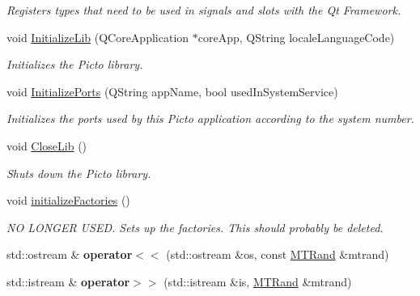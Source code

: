 \begin{DoxyCompactItemize}
\begin{DoxyCompactList}\small\item\em Registers types that need to be used in signals and slots with the Qt Framework. \end{DoxyCompactList}\item 
void \hyperlink{namespace_picto_ab626f6cf7953f6f0c2947f0f03b8e62e}{Initialize\-Lib} (Q\-Core\-Application $\ast$core\-App, Q\-String locale\-Language\-Code)
\begin{DoxyCompactList}\small\item\em Initializes the Picto library. \end{DoxyCompactList}\item 
void \hyperlink{namespace_picto_a435830b96734ccf94079709ecaababdd}{Initialize\-Ports} (Q\-String app\-Name, bool used\-In\-System\-Service)
\begin{DoxyCompactList}\small\item\em Initializes the ports used by this Picto application according to the system number. \end{DoxyCompactList}\item 
void \hyperlink{namespace_picto_a4c3a40f67614c57efafec4403453edcd}{Close\-Lib} ()
\begin{DoxyCompactList}\small\item\em Shuts down the Picto library. \end{DoxyCompactList}\item 
\hypertarget{namespace_picto_a1bf78a0dbbca2ca81a700e8b5b8a2d28}{void \hyperlink{namespace_picto_a1bf78a0dbbca2ca81a700e8b5b8a2d28}{initialize\-Factories} ()}\label{namespace_picto_a1bf78a0dbbca2ca81a700e8b5b8a2d28}

\begin{DoxyCompactList}\small\item\em N\-O L\-O\-N\-G\-E\-R U\-S\-E\-D. Sets up the factories. This should probably be deleted. \end{DoxyCompactList}\item 
\hypertarget{namespace_picto_a4a2ccba4c1a015e3a30b648e23c675e6}{std\-::ostream \& {\bfseries operator$<$$<$} (std\-::ostream \&os, const \hyperlink{class_picto_1_1_m_t_rand}{M\-T\-Rand} \&mtrand)}\label{namespace_picto_a4a2ccba4c1a015e3a30b648e23c675e6}

\item 
\hypertarget{namespace_picto_a0b70b7b6ed01ebe7abcf523cfee60263}{std\-::istream \& {\bfseries operator$>$$>$} (std\-::istream \&is, \hyperlink{class_picto_1_1_m_t_rand}{M\-T\-Rand} \&mtrand)}\label{namespace_picto_a0b70b7b6ed01ebe7abcf523cfee60263}


\end{DoxyCompactItemize}
